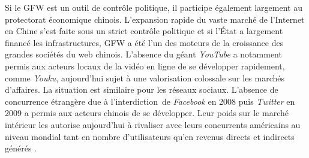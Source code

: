 Si le GFW est un outil de contrôle politique, il participe également largement au protectorat économique chinois. L’expansion rapide du vaste marché de l'Internet en Chine s’est faite sous un strict contrôle politique et si l’État a largement financé les infrastructures, GFW a été l’un des moteurs de la croissance des grandes sociétés du web chinois. L'absence du géant \textit{YouTube} a notamment permis aux acteurs locaux de la vidéo en ligne de se développer rapidement, comme \textit{Youku}, aujourd’hui sujet à une valorisation colossale sur les marchés d’affaires. La situation est similaire pour les réseaux sociaux. L'absence de concurrence étrangère due à l’interdiction de \textit{Facebook} en 2008 puis \textit{Twitter} en 2009 a permis aux acteurs chinois de se développer. Leur poids sur le marché intérieur les autorise aujourd’hui à rivaliser avec leurs concurrents américains au niveau mondial tant en nombre d’utilisateurs qu’en revenus directs et indirects générés \citep{CIW2012}.

